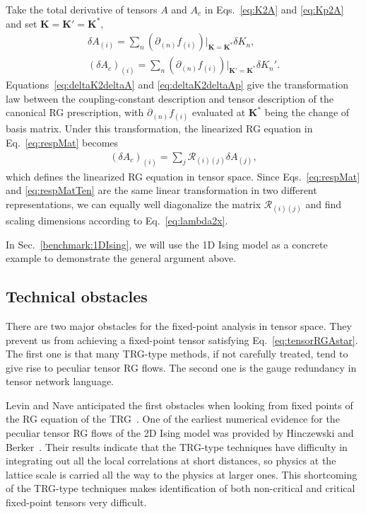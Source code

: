 \documentclass[aps,prb,reprint,superscriptaddress,floatfix]{revtex4-2}
\begin{document}
%
Take the total derivative of tensors $A$ and $A_c$ in Eqs.~\eqref{eq:K2A} and \eqref{eq:Kp2A} and set $\mathbf{K} = \mathbf{K}' = \mathbf{K}^*$, 
%
\begin{align}
    \delta A_{(i)} = \sum_n \left(\partial_{(n)}
    f_{(i)}\right)\Bigr|_{\mathbf{K} = \mathbf{K}^*} \delta K_n,
    \label{eq:deltaK2deltaA} \\
    \left(\delta A_c \right)_{(i)} = \sum_n \left(\partial_{(n)}
    f_{(i)}\right)\Bigr|_{\mathbf{K}' = \mathbf{K}^*} \delta
    K_n'.\label{eq:deltaK2deltaAp}
\end{align}
%
Equations~\eqref{eq:deltaK2deltaA} and \eqref{eq:deltaK2deltaAp} give the transformation law between the coupling-constant description and tensor description of the canonical RG prescription, with $\partial_{(n)}f_{(i)}$ evaluated at $\mathbf{K}^*$ being the change of basis matrix.
Under this transformation, the linearized RG equation in Eq.~\eqref{eq:respMat} becomes
%
\begin{align}\label{eq:respMatTen}
    \left(\delta A_c\right)_{(i)} = \sum_j
    \mathcal{R}_{(i)(j)} \delta A_{(j)},
\end{align}
%
which defines the linearized RG equation in tensor space.
Since Eqs.~\eqref{eq:respMat} and \eqref{eq:respMatTen} are the same linear transformation in two different representations, we can equally well diagonalize the matrix $\mathcal{R}_{(i)(j)}$ and find scaling dimensions according to Eq.~\eqref{eq:lambda2x}. 
%

In Sec.~\ref{benchmark:1DIsing}, we will use the 1D Ising model as a
concrete example to demonstrate the general argument above.
%

\subsection{Technical obstacles}
There are two major obstacles for the fixed-point analysis in tensor space. 
They prevent us from achieving a fixed-point tensor satisfying Eq.~\eqref{eq:tensorRGAstar}.
The first one is that many TRG-type methods, if not carefully treated, tend to give rise to peculiar tensor RG flows.
The second one is the gauge redundancy in tensor network language.
%

Levin and Nave anticipated the first obstacles when looking from fixed points of the RG equation of the TRG~\cite{LevinTalk}.
One of the earliest numerical evidence for the peculiar tensor RG flows of the 2D Ising model was provided by Hinczewski and Berker~\cite{Berker2008}. 
Their results indicate that the TRG-type techniques have difficulty in integrating out all the local correlations at short distances, so physics at the lattice scale is carried all the way to the physics at larger ones. 
This shortcoming of the TRG-type techniques makes identification of both non-critical and critical fixed-point tensors very difficult.
%
\end{document}
